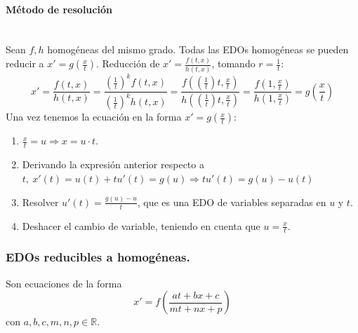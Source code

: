 \documentclass[11pt, a4paper,twoside]{article}
\theoremstyle{theorem-style}  %
\theoremstyle{definition-style}
\theoremstyle{example-style}
\begin{document}
\paragraph{Método de resolución} \ \\
Sean $ f,h $ homogéneas del mismo grado. Todas las EDOs homogéneas se pueden reducir a $ x'=g(\frac{x}{t})$.
Reducción de  $ x'=\frac{f(t,x)}{h(t,x)} $, tomando $ r=\frac{1}{t} $:
	\[ x'= \frac{f(t,x)}{h(t,x)}=\frac{(\frac{1}{t})^kf(t,x)}{(\frac{1}{t})^kh(t,x)}=\frac{f((\frac{1}{t})t,\frac{x}{t})}{h((\frac{1}{t})t,\frac{x}{t})}=\frac{f(1,\frac{x}{t})}{h(1,\frac{x}{t})}=g(\frac{x}{t})\]
	Una vez tenemos la ecuación en la forma $ x'=g(\frac{x}{t}) $:
	\begin{enumerate}
		\item $ \frac{x}{t}=u\Rightarrow x=u\cdot t $.
		\item Derivando la expresión anterior respecto a $t,\  x'(t)=u(t)+tu'(t)=g(u) \Rightarrow tu'(t)=g(u)-u(t) $
		\item Resolver $ u'(t)=\frac{g(u)-u}{t} $, que es una EDO de variables separadas en $ u $ y $ t $.
		\item Deshacer el cambio de variable, teniendo en cuenta que $ u=\frac{x}{t} $.
	\end{enumerate}

\subsubsection{EDOs reducibles a homogéneas.}
Son ecuaciones de la forma \[ x'=f(\frac{at+bx+c}{mt+nx+p}) \]con $ a,b,c,m,n,p \in \mathbb{R} $.
\end{document}
